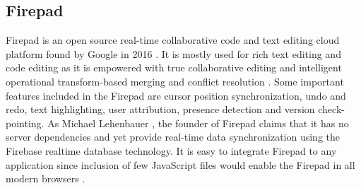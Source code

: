 \subsection{Firepad}

Firepad is an open source real-time collaborative 
code and text editing cloud
platform found by Google in 2016 
\cite{hid-sp18-409-www-firepad}.  It is mostly
used for rich text editing and code editing as it 
is empowered with true
collaborative editing and intelligent operational 
transform-based merging and
conflict resolution 
\cite{hid-sp18-409-www-firepad-wikipedia}. Some 
important
features included in the Firepad are cursor 
position synchronization, undo and
redo, text highlighting, user attribution, 
presence detection and version
check-pointing. As Michael Lehenbauer 
\cite{hid-sp18-409-www-firepad}, the
founder of Firepad claims that it has no server 
dependencies and yet provide
real-time data synchronization using the Firebase 
realtime database technology.
It is easy to integrate Firepad to any application 
since inclusion of few
JavaScript files would enable the Firepad in all 
modern browsers
\cite{hid-sp18-409-www-firepad}.
